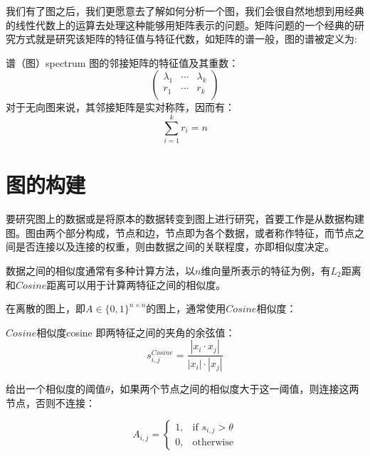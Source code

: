 \documentclass[color=gray,base=hide,cn]{elegantbook}
\begin{document}
我们有了图之后，我们更愿意去了解如何分析一个图，我们会很自然地想到用经典的线性代数上的运算去处理这种能够用矩阵表示的问题。矩阵问题的一个经典的研究方式就是研究该矩阵的特征值与特征代数，如矩阵的谱一般，图的谱被定义为:
\begin{definition}{谱（图）}{spectrum}
    图的邻接矩阵的特征值及其重数：
\begin{equation*}
    \begin{pmatrix} 
        \lambda_1 & \cdots & \lambda_k\\
        r_1 & \cdots & r_k\\
    \end{pmatrix}
\end{equation*}
对于无向图来说，其邻接矩阵是实对称阵，因而有：
\begin{equation}
    \sum_{i=1}^k r_i = n
\end{equation}
\end{definition}

\chapter{图的构建}

要研究图上的数据或是将原本的数据转变到图上进行研究，首要工作是从数据构建图\cite{silva2016machine}。图由两个部分构成，节点和边，节点即为各个数据，或者称作特征，而节点之间是否连接以及连接的权重，则由数据之间的关联程度，亦即相似度决定。

数据之间的相似度通常有多种计算方法，以$n$维向量所表示的特征为例，有$L_2$距离和$Cosine$距离可以用于计算两特征之间的相似度。


在离散的图上，即$A \in \{0,1\}^{n\times n}$的图上，通常使用$Cosine$相似度：

\begin{definition}{$Cosine$相似度}{cosine}
    即两特征之间的夹角的余弦值：
    \begin{equation}
        s^{Cosine}_{i,j} = \frac{\left |x_i \cdot x_j  \right |}{\left | x_i \right | \cdot \left | x_j \right |}
    \end{equation}
\end{definition}

给出一个相似度的阈值$\theta$，如果两个节点之间的相似度大于这一阈值，则连接这两节点，否则不连接：

\begin{equation}
    A_{i,j} = \left\{\begin{matrix}
1, & \text{if } s_{i,j} > \theta \\ 
0, & \text{otherwise}
\end{matrix}\right.
\end{equation}
\end{document}
